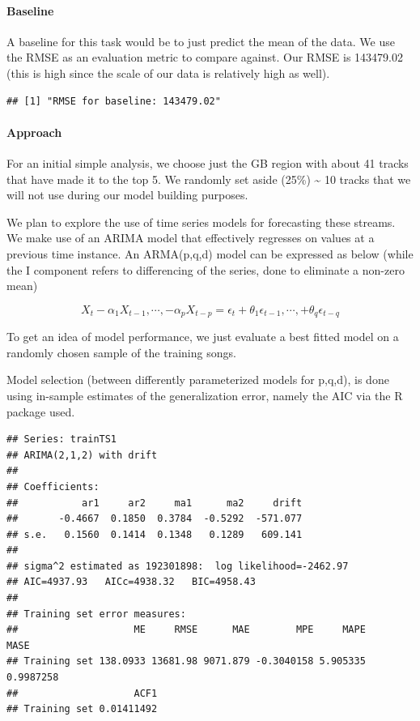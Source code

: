 \documentclass[]{article}
\let\oldparagraph\paragraph
\renewcommand{\paragraph}[1]{\oldparagraph{#1}\mbox{}}
\begin{document}
\paragraph{Baseline}\label{baseline}

A baseline for this task would be to just predict the mean of the data.
We use the RMSE as an evaluation metric to compare against. Our RMSE is
143479.02 (this is high since the scale of our data is relatively high
as well).

\begin{verbatim}
## [1] "RMSE for baseline: 143479.02"
\end{verbatim}

\paragraph{Approach}\label{approach}

For an initial simple analysis, we choose just the GB region with about
41 tracks that have made it to the top 5. We randomly set aside (25\%)
\textasciitilde{} 10 tracks that we will not use during our model
building purposes.

We plan to explore the use of time series models for forecasting these
streams. We make use of an ARIMA model that effectively regresses on
values at a previous time instance. An ARMA(p,q,d) model can be
expressed as below (while the I component refers to differencing of the
series, done to eliminate a non-zero mean)

\[
X_t - \alpha_1X_{t-1}, \cdots, -\alpha_pX_{t-p} = \epsilon_t +\theta_1\epsilon_{t-1},\cdots,+\theta_q\epsilon_{t-q} 
\]

To get an idea of model performance, we just evaluate a best fitted
model on a randomly chosen sample of the training songs.

Model selection (between differently parameterized models for p,q,d), is
done using in-sample estimates of the generalization error, namely the
AIC via the R package used.

\begin{verbatim}
## Series: trainTS1 
## ARIMA(2,1,2) with drift 
## 
## Coefficients:
##           ar1     ar2     ma1      ma2     drift
##       -0.4667  0.1850  0.3784  -0.5292  -571.077
## s.e.   0.1560  0.1414  0.1348   0.1289   609.141
## 
## sigma^2 estimated as 192301898:  log likelihood=-2462.97
## AIC=4937.93   AICc=4938.32   BIC=4958.43
## 
## Training set error measures:
##                    ME     RMSE      MAE        MPE     MAPE      MASE
## Training set 138.0933 13681.98 9071.879 -0.3040158 5.905335 0.9987258
##                    ACF1
## Training set 0.01411492
\end{verbatim}
\end{document}
